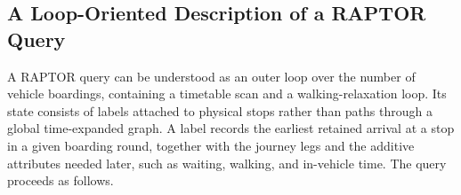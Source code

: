 
\subsection{A Loop-Oriented Description of a RAPTOR Query}
\label{sec:raptor-loop-description}

A RAPTOR query can be understood as an outer loop over the number of vehicle
boardings, containing a timetable scan and a walking-relaxation loop.  Its
state consists of labels attached to physical stops rather than paths through
a global time-expanded graph.  A label records the earliest retained arrival
at a stop in a given boarding round, together with the journey legs and the
additive attributes needed later, such as waiting, walking, and in-vehicle
time.  The query proceeds as follows.

